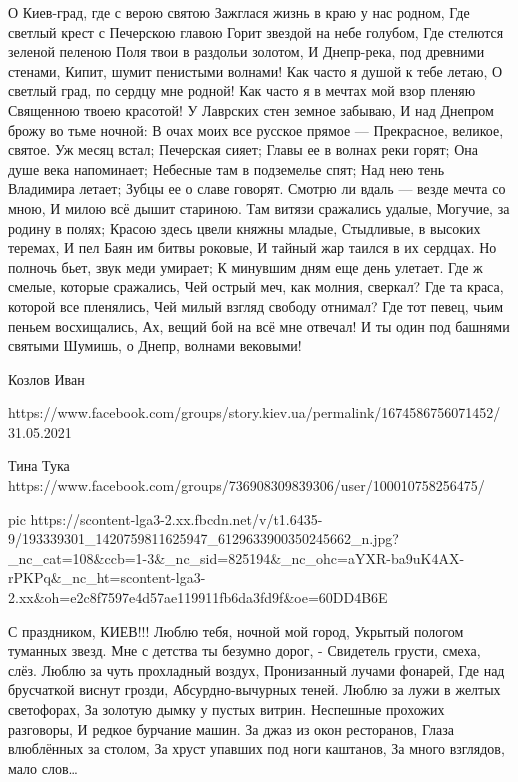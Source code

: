  
 
 
 
 

О Киев-град, где с верою святою
Зажглася жизнь в краю у нас родном,
Где светлый крест с Печерскою главою
Горит звездой на небе голубом,
Где стелются зеленой пеленою
Поля твои в раздольи золотом,
И Днепр-река, под древними стенами,
Кипит, шумит пенистыми волнами!
Как часто я душой к тебе летаю,
О светлый град, по сердцу мне родной!
Как часто я в мечтах мой взор пленяю
Священною твоею красотой!
У Лаврских стен земное забываю,
И над Днепром брожу во тьме ночной:
В очах моих все русское прямое —
Прекрасное, великое, святое.
Уж месяц встал; Печерская сияет;
Главы ее в волнах реки горят;
Она душе века напоминает;
Небесные там в подземелье спят;
Над нею тень Владимира летает;
Зубцы ее о славе говорят.
Смотрю ли вдаль — везде мечта со мною,
И милою всё дышит стариною.
Там витязи сражались удалые,
Могучие, за родину в полях;
Красою здесь цвели княжны младые,
Стыдливые, в высоких теремах,
И пел Баян им битвы роковые,
И тайный жар таился в их сердцах.
Но полночь бьет, звук меди умирает;
К минувшим дням еще день улетает.
Где ж смелые, которые сражались,
Чей острый меч, как молния, сверкал?
Где та краса, которой все пленялись,
Чей милый взгляд свободу отнимал?
Где тот певец, чьим пеньем восхищались,
Ах, вещий бой на всё мне отвечал!
И ты один под башнями святыми
Шумишь, о Днепр, волнами вековыми!

Козлов Иван

https://www.facebook.com/groups/story.kiev.ua/permalink/1674586756071452/
31.05.2021

Тина Тука
https://www.facebook.com/groups/736908309839306/user/100010758256475/

\ifcmt
  pic https://scontent-lga3-2.xx.fbcdn.net/v/t1.6435-9/193339301_1420759811625947_6129633900350245662_n.jpg?_nc_cat=108&ccb=1-3&_nc_sid=825194&_nc_ohc=aYXR-ba9uK4AX-rPKPq&_nc_ht=scontent-lga3-2.xx&oh=e2c8f7597e4d57ae119911fb6da3fd9f&oe=60DD4B6E
\fi

С праздником, КИЕВ!!!
Люблю тебя, ночной мой город,
Укрытый пологом туманных звезд.
Мне с детства ты безумно дорог, - 
Свидетель грусти, смеха, слёз.
Люблю за чуть прохладный воздух,
Пронизанный лучами фонарей, 
Где над брусчаткой виснут грозди,
Абсурдно-вычурных теней.
Люблю за лужи в желтых светофорах,
За золотую дымку у пустых витрин.
Неспешные прохожих разговоры,
И редкое бурчание машин.
За джаз из окон ресторанов,
Глаза влюблённых за столом,
За хруст упавших под ноги каштанов,
За много взглядов, мало слов…


